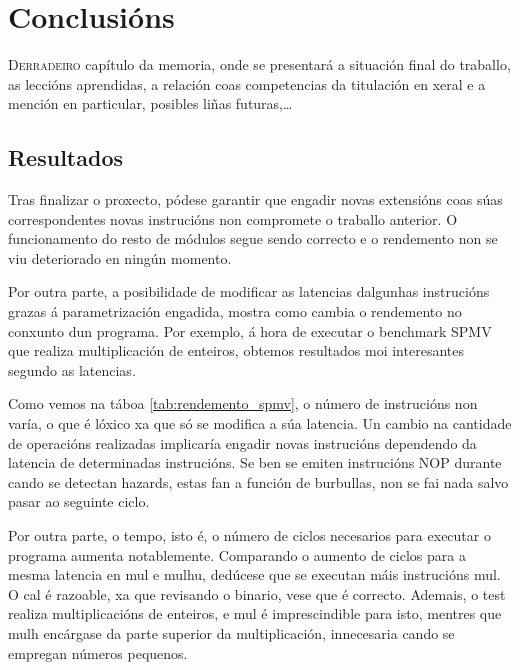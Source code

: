 \chapter{Conclusións}
\label{chap:conclusions}

\lettrine{D}{erradeiro} capítulo da memoria, onde se presentará a situación final do traballo, as leccións aprendidas, a relación coas competencias da titulación en xeral e a mención en particular, posibles liñas futuras,\dots

\section{Resultados}\label{chap:resultados}
Tras finalizar o proxecto, pódese garantir que engadir novas extensións coas súas correspondentes novas instrucións non compromete o traballo anterior. O funcionamento do resto de módulos segue sendo correcto e o rendemento non se viu deteriorado en ningún momento.

Por outra parte, a posibilidade de modificar as latencias dalgunhas instrucións grazas á parametrización engadida, mostra como cambia o rendemento no conxunto dun programa. Por exemplo, á hora de executar o benchmark SPMV que realiza multiplicación de enteiros, obtemos resultados moi interesantes segundo as latencias. 

Como vemos na táboa \ref{tab:rendemento_spmv}, o número de instrucións non varía, o que é lóxico xa que só se modifica a súa latencia. Un cambio na cantidade de operacións realizadas implicaría engadir novas instrucións dependendo da latencia de determinadas instrucións. Se ben se emiten instrucións NOP durante cando se detectan hazards, estas fan a función de burbullas, non se fai nada salvo pasar ao seguinte ciclo. 

Por outra parte, o tempo, isto é, o número de ciclos necesarios para executar o programa aumenta notablemente. Comparando o aumento de ciclos para a mesma latencia en mul e mulhu, dedúcese que se executan máis instrucións mul. O cal é razoable, xa que revisando o binario, vese que é correcto. Ademais, o test realiza multiplicacións de enteiros, e mul é imprescindible para isto, mentres que mulh encárgase da parte superior da multiplicación, innecesaria cando se empregan números pequenos.

